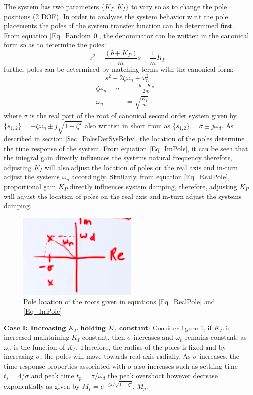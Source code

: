 The system has two parameters $\{K_P, K_I\}$ to vary so as to change the pole positions (2 DOF). In order to analyses the system behavior w.r.t the pole placements the poles of the system transfer function can be determined first. From equation \eqref{Eq_Random10}, the denominator can be written in the canonical form so as to determine the poles:
\begin{equation}
	s^2 + \frac{(b + K_P)}{m}s + \frac{1}{m}K_I
\end{equation}
further poles can be determined by matching terms with the canonical form: $$ s^2 + 2\zeta\omega_{n} + \omega_{n}^2 $$
\begin{align}
	\zeta \omega_{n} = \sigma &= \frac{(b + K_P)}{2m} \label{Eq_RealPole} \\ 
	\omega_{n} &= \sqrt{\frac{K_I}{m}} \label{Eq_ImPole}
\end{align}
where $\sigma$ is the real part of the root of canonical second order system given by $\{s_{1,2}\} = -\zeta \omega_{n} \pm j \sqrt{1 - \zeta^2}$ also written in short from as $\{s_{1,2}\} = \sigma \pm j \omega_{d}$. As described in section \ref{Sec_PolesDetSysBehv}, the location of the poles determine the time response of the system. From equation \ref{Eq_ImPole}, it can be seen that the integral gain directly influences the systems natural frequency therefore, adjusting $K_I$ will also adjust the location of poles on the real axis and in-turn adjust the systems $\omega_{n}$ accordingly. Similarly, from equation \eqref{Eq_RealPole}, proportional gain $K_P$ directly influences system damping, therefore, adjusting $K_P$ will adjust the location of poles on the real axis and in-turn adjust the systems damping.

\begin{figure}[h!]
	\centering
	\includegraphics[width=0.5\linewidth]{Bilder/PolePlacement_1}
	\caption{Pole location of the roots given in equations \eqref{Eq_RealPole} and \eqref{Eq_ImPole}}
	\label{Fig_PoleLocation1}
\end{figure}
\textbf{Case I: Increasing $K_P$ holding $K_I$ constant}:
Consider figure \ref{Fig_PoleLocation1}, if $K_P$ is increased maintaining $K_I$ constant, then $\sigma$ increases and $\omega_{n}$ remains constant, as $\omega_{n}$ is the function of $K_I$. Therefore, the radius of the poles is fixed and by increasing $\sigma$, the poles will move towards real axis radially. As $\sigma$ increases, the time response properties associated with $\sigma$ also increases such as settling time $t_s = 4/\sigma$ and peak time $t_p = \pi/\omega_{d}$ the peak overshoot however decrease exponentially as given by $M_p = e^{-\zeta \pi / \sqrt{1 - \zeta^2}}$. $M_p$.

